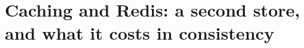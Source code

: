 \chapter{Caching and Redis: a second store, and what it costs in consistency}
\label{ch:caching-and-redis-a-second-store-and}

